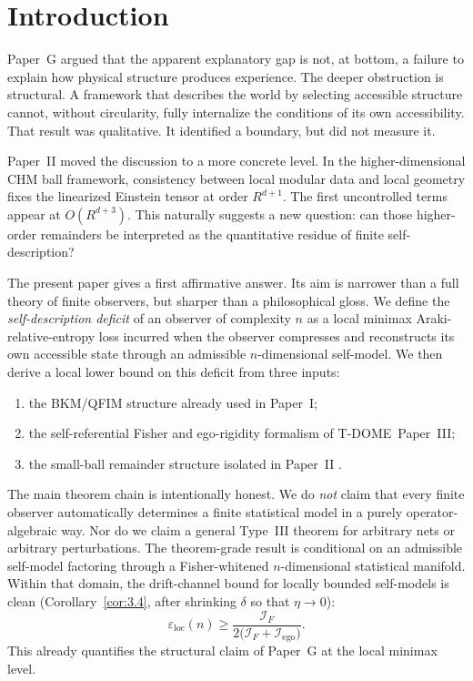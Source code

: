 \documentclass[12pt]{article}
\theoremstyle{definition}
\theoremstyle{remark}
\begin{document}
\clearpage
\tableofcontents
\clearpage

%
\section{Introduction}\label{sec:1}

Paper~G\cite{PaperG} argued that the apparent explanatory gap is not,
at bottom, a failure to explain how physical structure produces
experience. The deeper obstruction is structural. A framework that
describes the world by selecting accessible structure cannot, without
circularity, fully internalize the conditions of its own accessibility.
That result was qualitative. It identified a boundary, but did not
measure it.

Paper~II\cite{PaperII} moved the discussion to a more concrete level.
In the higher-dimensional CHM ball framework, consistency between local
modular data and local geometry fixes the linearized Einstein tensor at
order \(R^{d+1}\). The first uncontrolled terms appear at
\(O(R^{d+3})\). This naturally suggests a new question: can those
higher-order remainders be interpreted as the quantitative residue of
finite self-description?

The present paper gives a first affirmative answer. Its aim is narrower
than a full theory of finite observers, but sharper than a philosophical
gloss. We define the \emph{self-description deficit} of an observer of
complexity \(n\) as a local minimax Araki-relative-entropy loss incurred
when the observer compresses and reconstructs its own accessible state
through an admissible \(n\)-dimensional self-model. We then derive a
local lower bound on this deficit from three inputs:
\begin{enumerate}
\item the BKM/QFIM structure already used in Paper~I\cite{PaperI};
\item the self-referential Fisher and ego-rigidity formalism of
T-DOME~Paper~III\cite{TDOMEIII};
\item the small-ball remainder structure isolated in Paper~II
\cite{PaperII}.
\end{enumerate}

The main theorem chain is intentionally honest. We do \emph{not} claim
that every finite observer automatically determines a finite statistical
model in a purely operator-algebraic way. Nor do we claim a general
Type~III theorem for arbitrary nets or arbitrary perturbations. The
theorem-grade result is conditional on an admissible self-model
factoring through a Fisher-whitened \(n\)-dimensional statistical
manifold. Within that domain, the drift-channel bound for locally
bounded self-models is clean (Corollary~\ref{cor:3.4}, after shrinking
\(\delta\) so that \(\eta\to 0\)):
\[
\varepsilon_{\mathrm{loc}}(n)
\ge
\frac{\mathcal{I}_F}{2\bigl(\mathcal{I}_F+\mathcal{I}_{\mathrm{ego}}\bigr)}.
\]
This already quantifies the structural claim of Paper~G at the local
minimax level.
\end{document}
